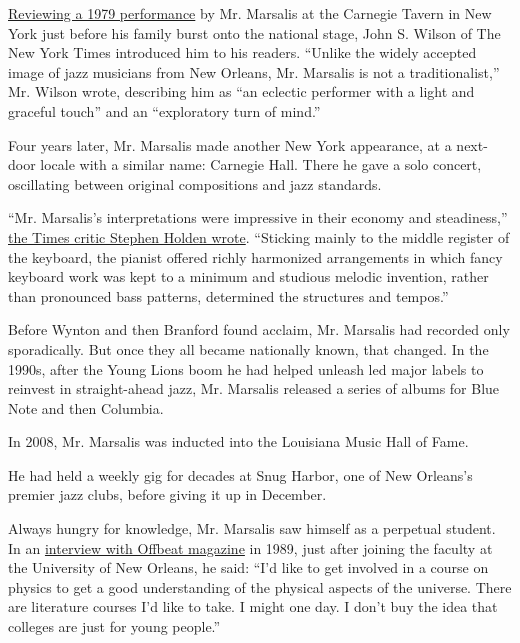 \href{https://www.nytimes.com/1979/07/07/archives/jazz-piano-ellis-marsalis-plays-at-carnegie-tavern.html?searchResultPosition=3}{Reviewing
a 1979 performance} by Mr. Marsalis at the Carnegie Tavern in New York
just before his family burst onto the national stage, John S. Wilson of
The New York Times introduced him to his readers. ``Unlike the widely
accepted image of jazz musicians from New Orleans, Mr. Marsalis is not a
traditionalist,'' Mr. Wilson wrote, describing him as ``an eclectic
performer with a light and graceful touch'' and an ``exploratory turn of
mind.''

Four years later, Mr. Marsalis made another New York appearance, at a
next-door locale with a similar name: Carnegie Hall. There he gave a
solo concert, oscillating between original compositions and jazz
standards.

``Mr. Marsalis's interpretations were impressive in their economy and
steadiness,''
\href{https://www.nytimes.com/1983/06/29/arts/ellis-marsalis-s-solo-piano.html}{the
Times critic Stephen Holden wrote}. ``Sticking mainly to the middle
register of the keyboard, the pianist offered richly harmonized
arrangements in which fancy keyboard work was kept to a minimum and
studious melodic invention, rather than pronounced bass patterns,
determined the structures and tempos.''

Before Wynton and then Branford found acclaim, Mr. Marsalis had recorded
only sporadically. But once they all became nationally known, that
changed. In the 1990s, after the Young Lions boom he had helped unleash
led major labels to reinvest in straight-ahead jazz, Mr. Marsalis
released a series of albums for Blue Note and then Columbia.

In 2008, Mr. Marsalis was inducted into the Louisiana Music Hall of
Fame.

He had held a weekly gig for decades at Snug Harbor, one of New
Orleans's premier jazz clubs, before giving it up in December.

Always hungry for knowledge, Mr. Marsalis saw himself as a perpetual
student. In an
\href{http://www.offbeat.com/articles/ellis-marsalis-interview/}{interview
with Offbeat magazine} in 1989, just after joining the faculty at the
University of New Orleans, he said: ``I'd like to get involved in a
course on physics to get a good understanding of the physical aspects of
the universe. There are literature courses I'd like to take. I might one
day. I don't buy the idea that colleges are just for young people.''

